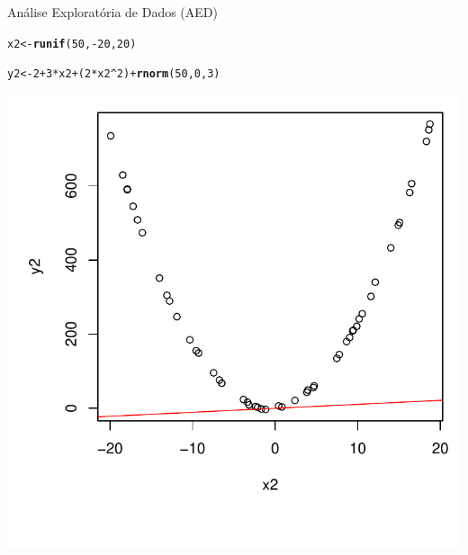 \documentclass{beamer}\usepackage[]{graphicx}\usepackage[]{color}
\makeatletter
\newcommand{\hlnum}[1]{\textcolor[rgb]{0.686,0.059,0.569}{#1}}%
\newcommand{\hlopt}[1]{\textcolor[rgb]{0,0,0}{#1}}%
\newcommand{\hlstd}[1]{\textcolor[rgb]{0.345,0.345,0.345}{#1}}%
\newcommand{\hlkwb}[1]{\textcolor[rgb]{0.69,0.353,0.396}{#1}}%
\newcommand{\hlkwd}[1]{\textcolor[rgb]{0.737,0.353,0.396}{\textbf{#1}}}%
\newenvironment{kframe}{%
 \def\at@end@of@kframe{}%
 \ifinner\ifhmode%
  \def\at@end@of@kframe{\end{minipage}}%
  \begin{minipage}{\columnwidth}%
 \fi\fi%
 \def\FrameCommand##1{\hskip\@totalleftmargin \hskip-\fboxsep
 \colorbox{shadecolor}{##1}\hskip-\fboxsep
     \hskip-\linewidth \hskip-\@totalleftmargin \hskip\columnwidth}%
 \MakeFramed {\advance\hsize-\width
   \@totalleftmargin\z@ \linewidth\hsize
   \@setminipage}}%
 {\par\unskip\endMakeFramed%
 \at@end@of@kframe}
\newenvironment{knitrout}{}{} %
\renewenvironment{knitrout}{\setlength{\topsep}{0mm}}{}
\makeatother
\begin{document}
\begin{frame}{Análise Exploratória de Dados (AED)}

\begin{knitrout}\scriptsize
{}\color{fgcolor}\begin{kframe}
\begin{alltt}
\hlstd{x2} \hlkwb{<-} \hlkwd{runif}\hlstd{(}\hlnum{50}\hlstd{,}\hlopt{-}\hlnum{20}\hlstd{,}\hlnum{20}\hlstd{)}

\hlstd{y2} \hlkwb{<-} \hlnum{2} \hlopt{+} \hlnum{3}\hlopt{*}\hlstd{x2} \hlopt{+} \hlstd{(}\hlnum{2}\hlopt{*}\hlstd{x2}\hlopt{^}\hlnum{2}\hlstd{)} \hlopt{+} \hlkwd{rnorm}\hlstd{(}\hlnum{50}\hlstd{,}\hlnum{0}\hlstd{,}\hlnum{3}\hlstd{)}
\end{alltt}
\end{kframe}
\end{knitrout}

\centering
\begin{knitrout}
\color{fgcolor}
\includegraphics[width=0.6\linewidth]{figure/ushapeplot-1} 

\end{knitrout}

\end{frame} 
\end{document}
